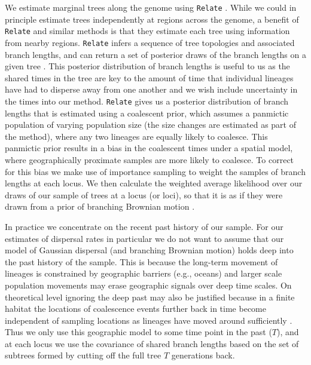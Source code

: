 \documentclass[12pt]{article}
\begin{document}
We estimate marginal trees along the genome using \texttt{Relate} \citep{speidel2019method}.
While we could in principle estimate trees independently at regions across the genome, a benefit of \texttt{Relate} and similar methods is that they estimate each tree using information from nearby regions.
\texttt{Relate} infers a sequence of tree topologies and associated branch lengths, and can return a set of posterior draws of the branch lengths on a given tree \citep[it was the only method that did so for a large number of samples when we began this work, but now see][]{wohns2021unified,deng2024robust}. 
This posterior distribution of branch lengths is useful to us as the shared times in the tree are key to the amount of time that individual lineages have had to disperse away from one another and we wish include uncertainty in the times into our method. 
\texttt{Relate} gives us a posterior distribution of branch lengths that is estimated using a coalescent prior, which assumes a panmictic population of varying population size (the size changes are estimated as part of the method), where any two lineages are equally likely to coalesce. 
This panmictic prior results in a bias in the coalescent times under a spatial model, where geographically proximate samples are more likely to coalesce. 
To correct for this bias we make use of importance sampling to weight the samples of branch lengths at each locus.  
We then calculate the weighted average likelihood over our draws of our sample of trees at a locus (or loci), so that it is as if they were drawn from a prior of branching Brownian motion \citep{meligkotsidou2007postprocessing}. 

In practice we concentrate on the recent past history of our sample. 
For our estimates of dispersal rates in particular we do not want to assume that our model of Gaussian dispersal (and branching Brownian motion) holds deep into the past history of the sample. 
This is because the long-term movement of lineages is constrained by geographic barriers (e.g., oceans) and larger scale population movements may erase geographic signals over deep time scales. 
On theoretical level ignoring the deep past may also be justified because in a finite habitat the locations of coalescence events further back in time become independent of sampling locations as lineages have moved around sufficiently \citep{wilkins2002coalescent}. 
Thus we only use this geographic model to some time point in the past ($T$), and at each locus we use the covariance of shared branch lengths based on the set of subtrees formed by cutting off the full tree $T$ generations back. 
\end{document}
